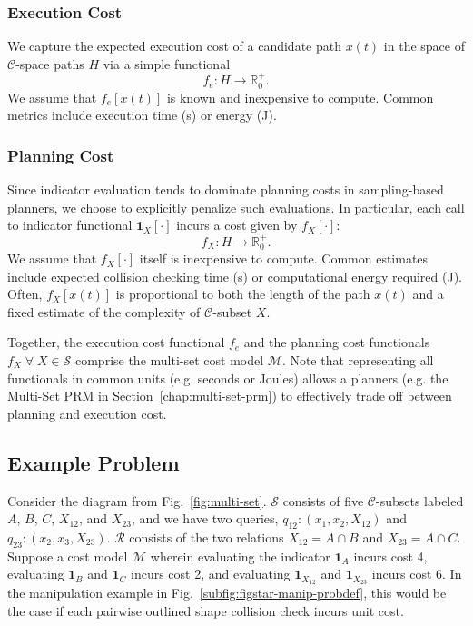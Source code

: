 \documentclass{report}
\begin{document}
\subsubsection{Execution Cost}
We capture the expected execution cost of a candidate path
$x(t)$ in the space of $\mathcal{C}$-space paths $H$
via a simple functional
\begin{equation}
  f_e : H \rightarrow \mathbb{R}_0^+ .
\end{equation}
We assume that $f_e[x(t)]$ is known and inexpensive to compute.
Common metrics include
execution time (s) or energy (J).

\subsubsection{Planning Cost}
Since indicator evaluation tends to dominate planning costs
in sampling-based planners,
we choose to explicitly penalize such evaluations.
In particular,
each call to indicator functional $\mathbf{1}_X[\cdot]$
incurs a cost given by $f_X[\cdot]$:
\begin{equation}
  f_X : H \rightarrow \mathbb{R}_0^+ .
\end{equation}
We assume that $f_X[\cdot]$ itself is inexpensive to compute.
Common estimates include expected collision checking time (s)
or computational energy required (J).
Often, $f_X[x(t)]$ is proportional to both
the length of the path $x(t)$
and a fixed estimate of the complexity of $\mathcal{C}$-subset $X$.

Together, the execution cost functional $f_e$
and the planning cost functionals $f_X \;\forall\; X \in \mathcal{S}$
comprise the multi-set cost model $\mathcal{M}$.
Note that representing all functionals in common units
(e.g. seconds or Joules) allows a planners
(e.g. the Multi-Set PRM in Section~\ref{chap:multi-set-prm})
to effectively trade off between planning and execution cost.

\subsection{Example Problem}
\label{subsec:multi-prm-example}

Consider the diagram from Fig.~\ref{fig:multi-set}.
$\mathcal{S}$ consists of five $\mathcal{C}$-subsets labeled
$A$, $B$, $C$, $X_{12}$, and $X_{23}$,
and we have two queries,
$q_{12}: (x_1, x_2, X_{12})$
and
$q_{23}: (x_2, x_3, X_{23})$.
$\mathcal{R}$ consists of the two relations
$X_{12} = A \cap B$ and $X_{23} = A \cap C$.
Suppose a cost model $\mathcal{M}$
wherein evaluating the indicator
$\mathbf{1}_A$ incurs cost 4,
evaluating $\mathbf{1}_B$ and $\mathbf{1}_C$ incurs cost 2,
and evaluating $\mathbf{1}_{X_{12}}$ and $\mathbf{1}_{X_{23}}$
incurs cost 6.
In the manipulation example in
Fig.~\ref{subfig:figstar-manip-probdef},
this would be the case if each
pairwise outlined shape collision check incurs unit cost.
\end{document}
